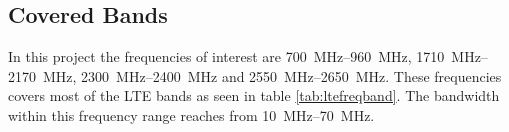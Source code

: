\subsection{Covered Bands}
In this project the frequencies of interest are \SIrange{700}{960}{MHz}, \SIrange{1710}{2170}{MHz}, \SIrange{2300}{2400}{MHz} and \SIrange{2550}{2650}{MHz}. These frequencies covers most of the LTE bands as seen in table \ref{tab:ltefreqband}. The bandwidth within this frequency range reaches from \SIrange{10}{70}{MHz}.  

